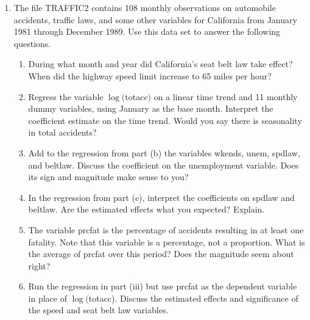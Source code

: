 \documentclass[12pt]{article}
\begin{document}
\begin{enumerate}
{\begin{enumerate}
\begin{lstlisting}
coefficients <- coef(summary(model))
r_squared <- summary(model)$r.squared

# Print key results
cat("Estimated Equation:\n")
cat("rsp500 = ", round(coefficients[1, 1], 4), " + ", round(coefficients[2, 1], 4), " * pcip + ", round(coefficients[3, 1], 4), " * i3\n\n")
cat("P-values:\n")
cat("pcip: ", round(coefficients[2, 4], 4), "\n")
cat("i3: ", round(coefficients[3, 4], 4), "\n\n")
cat("R-squared: ", round(r_squared, 4), "\n")

# Interpretation of predictability
if (coefficients[2, 4] < 0.05 | coefficients[3, 4] < 0.05) {
  cat("At least one of the predictors is statistically significant, suggesting that the return on the S&P 500 may be predictable.\n")
} else {
  cat("Neither predictor is statistically significant, so there is no strong evidence of predictability.\n")
}
    \end{lstlisting}
\end{enumerate}

}


\item The file TRAFFIC2 contains 108 monthly observations on automobile accidents, traffic laws, and some other variables for California from January 1981 through December 1989. Use this data set to answer the following questions.
\begin{enumerate}
    \item  During what month and year did California's seat belt law take effect? When did the highway speed limit increase to 65 miles per hour?
\item Regress the variable $\log($totacc$)$ on a linear time trend and 11 monthly dummy variables, using January as the base month. Interpret the coefficient estimate on the time trend. Would you say there is seasonality in total accidents?
\item Add to the regression from part (b) the variables wkends, unem, spdlaw, and beltlaw. Discuss the coefficient on the unemployment variable. Does its sign and magnitude make sense to you?
\item In the regression from part (c), interpret the coefficients on spdlaw and beltlaw. Are the estimated effects what you expected? Explain.
\item The variable prcfat is the percentage of accidents resulting in at least one fatality. Note that this variable is a percentage, not a proportion. What is the average of prcfat over this period? Does the magnitude seem about right?
\item Run the regression in part (iii) but use prcfat as the dependent variable in place of $\log($totacc). Discuss the estimated effects and significance of the speed and seat belt law variables.


\end{enumerate}
\end{enumerate}
\end{document}
